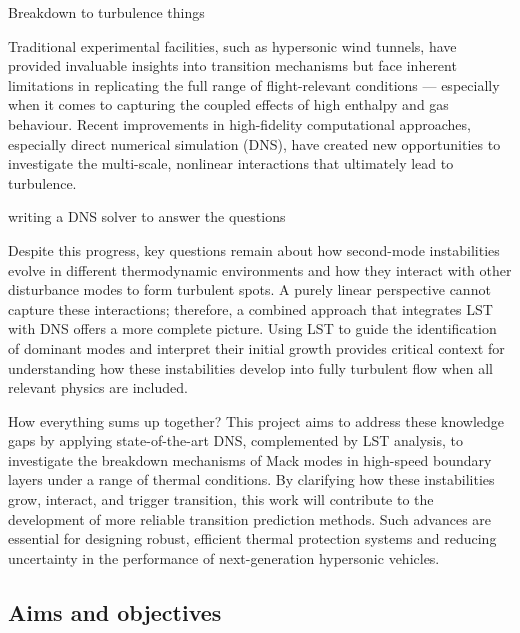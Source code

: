 Breakdown to turbulence things 

Traditional experimental facilities, such as hypersonic wind tunnels, have provided invaluable insights into transition mechanisms but face inherent limitations in replicating the full range of flight-relevant conditions — especially when it comes to capturing the coupled effects of high enthalpy and gas behaviour. Recent improvements in high-fidelity computational approaches, especially direct numerical simulation (DNS), have created new opportunities to investigate the multi-scale, nonlinear interactions that ultimately lead to turbulence. 

writing a DNS solver to answer the questions

Despite this progress, key questions remain about how second-mode instabilities evolve in different thermodynamic environments and how they interact with other disturbance modes to form turbulent spots. A purely linear perspective cannot capture these interactions; therefore, a combined approach that integrates LST with DNS offers a more complete picture. Using LST to guide the identification of dominant modes and interpret their initial growth provides critical context for understanding how these instabilities develop into fully turbulent flow when all relevant physics are included.

How everything sums up together? 
This project aims to address these knowledge gaps by applying state-of-the-art DNS, complemented by LST analysis, to investigate the breakdown mechanisms of Mack modes in high-speed boundary layers under a range of thermal conditions. By clarifying how these instabilities grow, interact, and trigger transition, this work will contribute to the development of more reliable transition prediction methods. Such advances are essential for designing robust, efficient thermal protection systems and reducing uncertainty in the performance of next-generation hypersonic vehicles.



\subsection{Aims and objectives}\label{subsection:aimsandobjectives}


